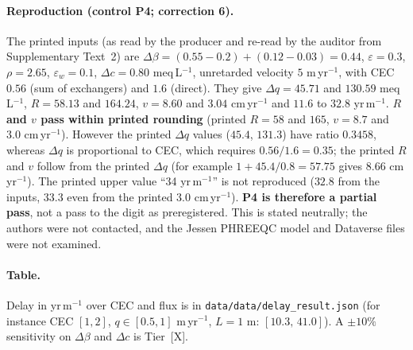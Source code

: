 \documentclass[10pt]{article}
\newcommand{\tier}[1]{\textsf{[#1]}}
\newcommand{\tX}{\tier{X}}
\begin{document}
\paragraph{Reproduction (control P4; correction 6).} The printed inputs (as read by the producer and re-read by the auditor from Supplementary Text~2) are $\Delta\beta=(0.55-0.2)+(0.12-0.03)=0.44$, $\varepsilon=0.3$, $\rho=2.65$, $\varepsilon_w=0.1$, $\Delta c=0.80$ meq\,L$^{-1}$, unretarded velocity $5$ m\,yr$^{-1}$, with CEC $0.56$ (sum of exchangers) and $1.6$ (direct). They give $\Delta q=45.71$ and $130.59$ meq\,L$^{-1}$, $R=58.13$ and $164.24$, $v=8.60$ and $3.04$ cm\,yr$^{-1}$ and $11.6$ to $32.8$ yr\,m$^{-1}$. \textbf{$R$ and $v$ pass within printed rounding} (printed $R=58$ and $165$, $v=8.7$ and $3.0$ cm\,yr$^{-1}$). However the printed $\Delta q$ values ($45.4$, $131.3$) have ratio $0.3458$, whereas $\Delta q$ is proportional to CEC, which requires $0.56/1.6=0.35$; the printed $R$ and $v$ follow from the printed $\Delta q$ (for example $1+45.4/0.8=57.75$ gives $8.66$ cm\,yr$^{-1}$). The printed upper value ``34 yr\,m$^{-1}$'' is not reproduced ($32.8$ from the inputs, $33.3$ even from the printed $3.0$ cm\,yr$^{-1}$). \textbf{P4 is therefore a partial pass}, not a pass to the digit as preregistered. This is stated neutrally; the authors were not contacted, and the Jessen PHREEQC model and Dataverse files were not examined.
\paragraph{Table.} Delay in yr\,m$^{-1}$ over CEC and flux is in \texttt{data/data/delay\_result.json} (for instance CEC $[1,2]$, $q\in[0.5,1]$ m\,yr$^{-1}$, $L=1$ m: $[10.3,\,41.0]$). A $\pm10\%$ sensitivity on $\Delta\beta$ and $\Delta c$ is Tier~\tX{}.

\end{document}

